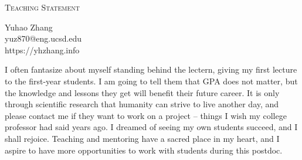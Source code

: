 \documentclass[letterpaper]{article}
\makeatletter
\newcommand{\soptitle}{Teaching Statement}
\newcommand{\yourname}{Yuhao Zhang}
\newcommand{\youremail}{yuz870@eng.ucsd.edu}
\newcommand{\amper}{{\fontspec[Scale=1]{Adobe Caslon Pro}\selectfont\itshape\&~{}}}
\makeatother
\begin{document}
\begin{center}{\huge \scshape \soptitle}\end{center}
\begin{center}\vspace{0.2em} {\Large \yourname\\}
  {\youremail\\} {https://yhzhang.info}\end{center}

\noindent I often fantasize about myself standing behind the lectern, giving my first lecture to the first-year students. I am going to tell them that GPA does not matter, but the knowledge and lessons they get will benefit their future career. It is only through scientific research that humanity can strive to live another day, and please contact me if they want to work on a project -- things I wish my college professor had said years ago. I dreamed of seeing my own students succeed, and I shall rejoice. Teaching and mentoring have a sacred place in my heart, and I aspire to have more opportunities to work with students during this postdoc.
\end{document}
